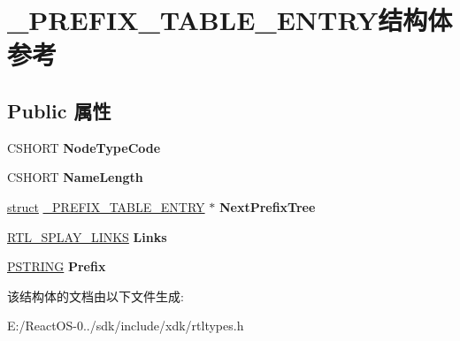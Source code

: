 \hypertarget{struct___p_r_e_f_i_x___t_a_b_l_e___e_n_t_r_y}{}\section{\+\_\+\+P\+R\+E\+F\+I\+X\+\_\+\+T\+A\+B\+L\+E\+\_\+\+E\+N\+T\+R\+Y结构体 参考}
\label{struct___p_r_e_f_i_x___t_a_b_l_e___e_n_t_r_y}
\subsection*{Public 属性}
\begin{DoxyCompactItemize}
\item 
\mbox{\label{struct___p_r_e_f_i_x___t_a_b_l_e___e_n_t_r_y_a050da808d18c93d398ef91d4a6d55a25}} 
C\+S\+H\+O\+RT {\bfseries Node\+Type\+Code}
\item 
\mbox{\label{struct___p_r_e_f_i_x___t_a_b_l_e___e_n_t_r_y_af91fe59588c9e3a565a9e8830fe9bf9c}} 
C\+S\+H\+O\+RT {\bfseries Name\+Length}
\item 
\mbox{\label{struct___p_r_e_f_i_x___t_a_b_l_e___e_n_t_r_y_ab803a3530e882e94667c68972b4866a6}} 
\hyperlink{interfacestruct}{struct} \hyperlink{struct___p_r_e_f_i_x___t_a_b_l_e___e_n_t_r_y}{\+\_\+\+P\+R\+E\+F\+I\+X\+\_\+\+T\+A\+B\+L\+E\+\_\+\+E\+N\+T\+RY} $\ast$ {\bfseries Next\+Prefix\+Tree}
\item 
\mbox{\label{struct___p_r_e_f_i_x___t_a_b_l_e___e_n_t_r_y_a7200fd3313ff52f3c82f255af294ab21}} 
\hyperlink{struct___r_t_l___s_p_l_a_y___l_i_n_k_s}{R\+T\+L\+\_\+\+S\+P\+L\+A\+Y\+\_\+\+L\+I\+N\+KS} {\bfseries Links}
\item 
\mbox{\label{struct___p_r_e_f_i_x___t_a_b_l_e___e_n_t_r_y_a8ea1680e1a8d81adae9787009a0a9bfa}} 
\hyperlink{struct___s_t_r_i_n_g}{P\+S\+T\+R\+I\+NG} {\bfseries Prefix}
\end{DoxyCompactItemize}


该结构体的文档由以下文件生成\+:\begin{DoxyCompactItemize}
\item 
E\+:/\+React\+O\+S-\/0../sdk/include/xdk/rtltypes.\+h\end{DoxyCompactItemize}
